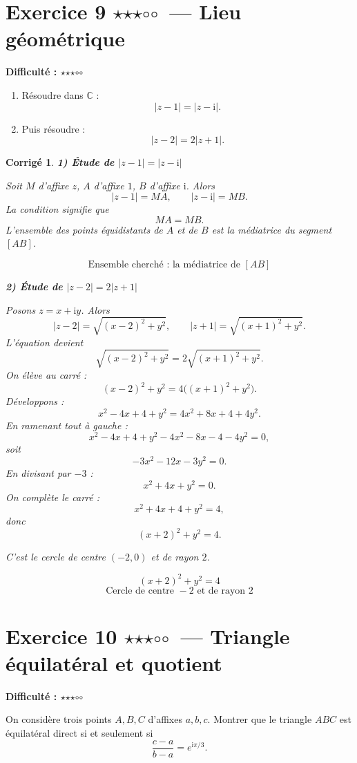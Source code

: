 \documentclass[11pt,a4paper]{article}
\newtheorem*{corrige}{Corrigé}
\newcommand{\C}{\mathbb{C}}
\newcommand{\ii}{\mathrm{i}}
\newcommand{\fullstar}{\(\star\)}
\newcommand{\emptystar}{\(\circ\)}
\newcommand{\threeStars}{\fullstar\fullstar\fullstar\emptystar\emptystar}
\newcommand{\difficulty}[1]{\textbf{Difficulté : #1}}
\begin{document}
\section{Exercice 9 \threeStars\ --- Lieu géométrique}
\difficulty{\threeStars}

\begin{enumerate}
    \item Résoudre dans \(\C\) :
    \[
    |z-1|=|z-\ii|.
    \]
    \item Puis résoudre :
    \[
    |z-2|=2|z+1|.
    \]
\end{enumerate}

\begin{corrige}
\textbf{1) Étude de \(|z-1|=|z-\ii|\)}

Soit \(M\) d'affixe \(z\), \(A\) d'affixe \(1\), \(B\) d'affixe \(\ii\). Alors
\[
|z-1|=MA,\qquad |z-\ii|=MB.
\]
La condition signifie que
\[
MA=MB.
\]
L'ensemble des points équidistants de \(A\) et de \(B\) est la médiatrice du segment \([AB]\).

\[
\boxed{\text{Ensemble cherché : la médiatrice de }[AB]}
\]

\textbf{2) Étude de \(|z-2|=2|z+1|\)}

Posons \(z=x+\ii y\). Alors
\[
|z-2|=\sqrt{(x-2)^2+y^2},
\qquad
|z+1|=\sqrt{(x+1)^2+y^2}.
\]
L'équation devient
\[
\sqrt{(x-2)^2+y^2}=2\sqrt{(x+1)^2+y^2}.
\]
On élève au carré :
\[
(x-2)^2+y^2=4\big((x+1)^2+y^2\big).
\]
Développons :
\[
x^2-4x+4+y^2=4x^2+8x+4+4y^2.
\]
En ramenant tout à gauche :
\[
x^2-4x+4+y^2-4x^2-8x-4-4y^2=0,
\]
soit
\[
-3x^2-12x-3y^2=0.
\]
En divisant par \(-3\) :
\[
x^2+4x+y^2=0.
\]
On complète le carré :
\[
x^2+4x+4+y^2=4,
\]
donc
\[
(x+2)^2+y^2=4.
\]

C'est le cercle de centre \((-2,0)\) et de rayon \(2\).

\[
\boxed{(x+2)^2+y^2=4}
\]
\[
\boxed{\text{Cercle de centre }-2\text{ et de rayon }2}
\]
\end{corrige}

\section{Exercice 10 \threeStars\ --- Triangle équilatéral et quotient}
\difficulty{\threeStars}

On considère trois points \(A,B,C\) d'affixes \(a,b,c\). Montrer que le triangle \(ABC\) est équilatéral direct si et seulement si
\[
\frac{c-a}{b-a}=e^{\ii\pi/3}.
\]
\end{document}
